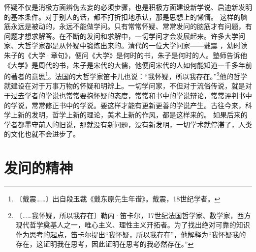 \documentclass[12pt,UTF-8,openany]{ctexbook}
\begin{document}
\begin{large}
    怀疑不仅是消极方面辨伪去妄的必须步骤，也是积极方面建设新学说、启迪新发明的基本条件。对于别人的话，都不打折扣地承认，那是思想上的懒惰。 这样的脑筋永远是被动的，永远不能做学问。只有常常怀疑、常常发问的脑筋才有问题，有问题才想求解答。在不断的发问和求解中，一切学问才会发展起来。许多大学问家、大哲学家都是从怀疑中锻炼出来的。清代的一位大学问家——戴震 ，幼时读朱子的《大学·章句》，便问《大学》是何时的书，朱子是何时的人。塾师告诉他《大学》是周代的书，朱子是宋代的大儒，他便问宋代的人如何能知道一千多年前的著者的意思\footnote{〔戴震……〕出自段玉裁《戴东原先生年谱》。戴震，18世纪学者。}。法国的大哲学家笛卡儿也说：“我怀疑，所以我存在。”\footnote{〔……我怀疑，所以我存在〕勒内·笛卡尔，17世纪法国哲学家、数学家，西方现代哲学奠基人之一，唯心主义、理性主义开拓者。为了找出绝对可靠的知识作为思考的起点，笛卡尔提出“我怀疑，所以我存在”，他解释为“我怀疑我的存在，这证明我在思考，因此证明在思考的我必然存在。”}他的哲学就建设在对于万事万物的怀疑和明辨上。一切学问家，不但对于流俗传说，就是对于过去学者的学说也常常要抱怀疑的态度，常常和书中的学说辩论，常常评判书中的学说，常常修正书中的学说。要这样才能有更新更善的学说产生。古往今来，科学上新的发明，哲学上新的理论，美术上新的作风，都是这样来的。 如果后来的学者都墨守前人的旧说，那就没有新问题，没有新发明，一切学术就停滞了，人类的文化也就不会进步了。
    
\end{large}



\chapter{发问的精神}
\end{document}
